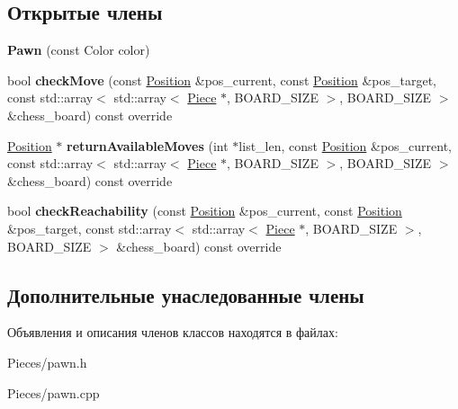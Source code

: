 \subsection*{Открытые члены}
\begin{DoxyCompactItemize}
\item 
\mbox{\label{class_chess_1_1_pawn_ab4d91a80c4da18b87f44962ec68a03cb}} 
{\bfseries Pawn} (const Color color)
\item 
\mbox{\label{class_chess_1_1_pawn_ae9725199f9bd4f3e37e4a05dd3f21bdc}} 
bool {\bfseries check\+Move} (const \mbox{\hyperlink{class_chess_1_1_position}{Position}} \&pos\+\_\+current, const \mbox{\hyperlink{class_chess_1_1_position}{Position}} \&pos\+\_\+target, const std\+::array$<$ std\+::array$<$ \mbox{\hyperlink{class_chess_1_1_piece}{Piece}} $\ast$, B\+O\+A\+R\+D\+\_\+\+S\+I\+ZE $>$, B\+O\+A\+R\+D\+\_\+\+S\+I\+ZE $>$ \&chess\+\_\+board) const override
\item 
\mbox{\label{class_chess_1_1_pawn_a839f5712501473ca3dc87ca8de2eec37}} 
\mbox{\hyperlink{class_chess_1_1_position}{Position}} $\ast$ {\bfseries return\+Available\+Moves} (int $\ast$list\+\_\+len, const \mbox{\hyperlink{class_chess_1_1_position}{Position}} \&pos\+\_\+current, const std\+::array$<$ std\+::array$<$ \mbox{\hyperlink{class_chess_1_1_piece}{Piece}} $\ast$, B\+O\+A\+R\+D\+\_\+\+S\+I\+ZE $>$, B\+O\+A\+R\+D\+\_\+\+S\+I\+ZE $>$ \&chess\+\_\+board) const override
\item 
\mbox{\label{class_chess_1_1_pawn_a56116e06fc8e4a8236858bc6991b9bc0}} 
bool {\bfseries check\+Reachability} (const \mbox{\hyperlink{class_chess_1_1_position}{Position}} \&pos\+\_\+current, const \mbox{\hyperlink{class_chess_1_1_position}{Position}} \&pos\+\_\+target, const std\+::array$<$ std\+::array$<$ \mbox{\hyperlink{class_chess_1_1_piece}{Piece}} $\ast$, B\+O\+A\+R\+D\+\_\+\+S\+I\+ZE $>$, B\+O\+A\+R\+D\+\_\+\+S\+I\+ZE $>$ \&chess\+\_\+board) const override
\end{DoxyCompactItemize}
\subsection*{Дополнительные унаследованные члены}


Объявления и описания членов классов находятся в файлах\+:\begin{DoxyCompactItemize}
\item 
Pieces/pawn.\+h\item 
Pieces/pawn.\+cpp\end{DoxyCompactItemize}
